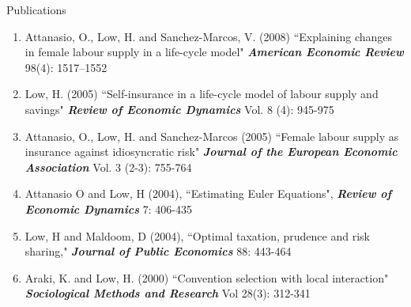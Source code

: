 \documentclass{resume} %
\begin{document}
\begin{rSection}{Publications}
\begin{enumerate}
\item Attanasio, O., Low, H. and Sanchez-Marcos, V. (2008) ``Explaining changes in female labour supply in a life-cycle model" \textit{\textbf{American Economic Review}}  98(4): 1517--1552
\item Low, H. (2005) ``Self-insurance in a life-cycle model of labour supply and savings" \textit{\textbf{Review of Economic Dynamics}} Vol. 8 (4): 945-975 
\item Attanasio, O., Low, H. and Sanchez-Marcos (2005) ``Female labour supply as insurance against idiosyncratic risk" \textit{\textbf{Journal of the European Economic Association}} Vol. 3 (2-3): 755-764
\item Attanasio O and Low, H (2004), ``Estimating Euler Equations", \textit{\textbf{Review of Economic Dynamics}} 7: 406-435 
\item Low, H and Maldoom, D (2004), ``Optimal taxation, prudence and risk sharing," \textit{\textbf{Journal of Public Economics}} 88: 443-464 
\item Araki, K. and Low, H. (2000) ``Convention selection with local interaction" \textit{\textbf{Sociological Methods and Research}} Vol 28(3): 312-341

\end{enumerate}
\end{rSection}
\end{document}
